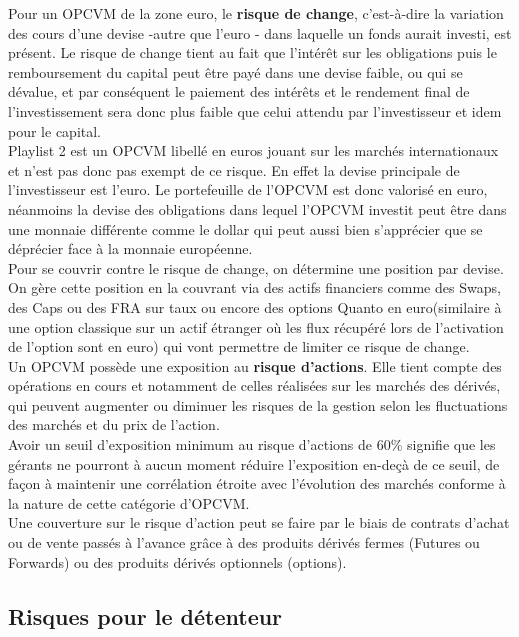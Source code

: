\documentclass[french,12pt,a4paper]{article}
\begin{document}
\indent Pour un OPCVM de la zone euro, le \textbf{risque de change}, c'est-à-dire la variation des cours d'une devise -autre que l'euro - dans laquelle un fonds aurait investi, est présent. Le risque de change tient au fait que l'intérêt sur les obligations puis le remboursement du capital peut être payé dans une devise faible, ou qui se dévalue, et par conséquent le paiement des intérêts et le rendement final de l'investissement sera donc plus faible que celui attendu par l'investisseur et idem pour le capital.\\
\indent Playlist 2 est un OPCVM libellé en euros jouant sur les marchés internationaux et n'est pas donc pas exempt de ce risque. En effet la devise principale de l'investisseur est l'euro. Le portefeuille de l'OPCVM est donc valorisé en euro, néanmoins la devise des obligations dans lequel l'OPCVM investit peut être dans une monnaie différente comme le dollar qui peut aussi bien s'apprécier que se déprécier face à la monnaie européenne. \\
\indent Pour se couvrir contre le risque de change, on détermine une position par devise. On gère cette position en la couvrant via des actifs financiers comme des Swaps, des Caps ou des FRA sur taux ou encore des options Quanto en euro(similaire à une option classique sur un actif étranger où les flux récupéré lors de l'activation de l'option sont en euro) qui vont permettre de limiter ce risque de change. \\

\indent Un OPCVM possède une exposition au \textbf{risque d'actions}. Elle tient compte des opérations en cours et notamment de celles réalisées sur les marchés des dérivés, qui peuvent augmenter ou diminuer les risques de la gestion selon les fluctuations des marchés et du prix de l'action. \\
Avoir un seuil d'exposition minimum au risque d'actions de 60\% signifie que les gérants ne pourront à aucun moment réduire l'exposition en-deçà de ce seuil, de façon à maintenir une corrélation étroite avec l'évolution des marchés conforme à la nature de cette catégorie d'OPCVM.\\
Une couverture sur le risque d'action peut se faire par le biais de contrats d'achat ou de vente passés à l'avance grâce à des produits dérivés fermes (Futures ou Forwards) ou des produits dérivés optionnels (options).\\


\subsection{Risques pour le détenteur}
\end{document}
